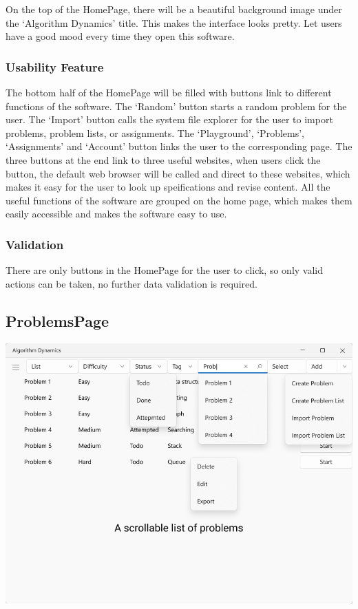 \documentclass[a4paper]{report}
\begin{document}
On the top of the HomePage, there will be a beautiful background image under the `Algorithm Dynamics' title. This makes the interface looks pretty. Let users have a good mood every time they open this software.

\subsubsection{Usability Feature}

The bottom half of the HomePage will be filled with buttons link to different functions of the software. The `Random' button starts a random problem for the user. The `Import' button calls the system file explorer for the user to import problems, problem lists, or assignments. The `Playground', `Problems', `Assignments' and `Account' button links the user to the corresponding page. The three buttons at the end link to three useful websites, when users click the button, the default web browser will be called and direct to these websites, which makes it easy for the user to look up speifications and revise content. All the useful functions of the software are grouped on the home page, which makes them easily accessible and makes the software easy to use.

\subsubsection{Validation}

There are only buttons in the HomePage for the user to click, so only valid actions can be taken, no further data validation is required.

\subsection{ProblemsPage}

\includegraphics[width=\textwidth, height=\textheight, keepaspectratio]{ProblemsPage-design}
\end{document}
